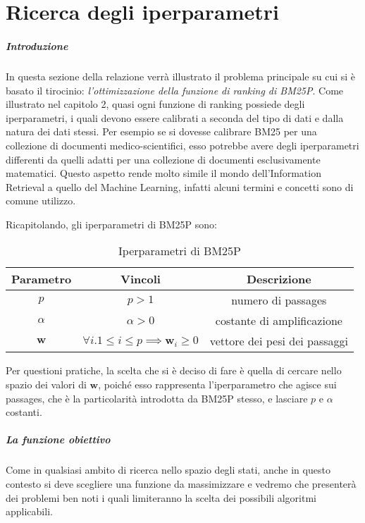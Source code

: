 \chapter{Ricerca degli iperparametri}

\paragraph{Introduzione}
In questa sezione della relazione verrà illustrato il problema principale su cui si è basato il tirocinio:
\textit{l'ottimizzazione della funzione di ranking di BM25P}.
Come illustrato nel capitolo 2, quasi ogni funzione di ranking possiede degli iperparametri, i quali
devono essere calibrati a seconda del tipo di dati e dalla natura dei dati stessi.
Per esempio se si dovesse calibrare BM25 per una collezione
di documenti medico-scientifici, esso potrebbe avere degli iperparametri
differenti da quelli adatti per una collezione di documenti esclusivamente matematici.
Questo aspetto rende molto simile il mondo dell'Information Retrieval a quello del Machine Learning,
infatti alcuni termini e concetti sono di comune utilizzo.


Ricapitolando, gli iperparametri di BM25P sono:
\begin{table}[h!]
	\centering
	\begin{tabular}{|c|c|c|}
		\hline
		Parametro & Vincoli & Descrizione \\
		\hline
		$p$ & $p>1$ & numero di passages \\
		\hline
		$\alpha$ & $\alpha > 0$ & costante di amplificazione \\
		\hline
		$\boldsymbol{w}$ & $\forall{i.1 \leq i \leq p}\implies \boldsymbol{w}_i \geq 0$ & vettore dei pesi dei passaggi \\
		\hline
	\end{tabular}
\caption{Iperparametri di BM25P}
\end{table}

Per questioni pratiche, la scelta che si è deciso di fare è quella di cercare
nello spazio dei valori di $\boldsymbol{w}$, poiché esso rappresenta l'iperparametro
che agisce sui passages, che è la particolarità introdotta da BM25P stesso, e lasciare
$p$ e $\alpha$ costanti.

\paragraph{La funzione obiettivo}

Come in qualsiasi ambito di ricerca nello spazio degli stati, anche in questo contesto
si deve scegliere una funzione da massimizzare e vedremo che presenterà dei problemi ben
noti i quali limiteranno la scelta dei possibili algoritmi applicabili.

